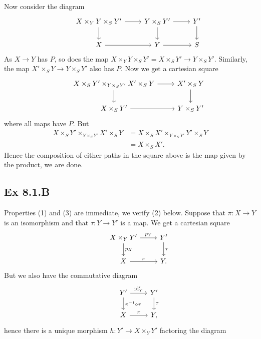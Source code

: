 \documentclass{article}
\theoremstyle{definition}
\newcommand{\id}{\text{id}}
\begin{document}
Now consider the diagram
\[
	\begin{tikzcd}
		& X \times_Y Y \times_S Y'
		\ar[r, ""]
		\ar[d, ""]
		& Y \times_S Y'
		\ar[r, ""]
		\ar[d, ""]
		& Y'
		\ar[d, ""] \\
		& X
		\ar[r, ""]
		& Y
		\ar[r, ""]
		& S
	\end{tikzcd}
\]
As $X \to Y$ has $P$, so does the map $X \times_Y Y \times_S Y' = X \times_S Y' \to Y \times_S Y'$.
Similarly, the map $X' \times_S Y \to Y \times_S Y'$ also has $P$. Now we get a cartesian square
\[
	\begin{tikzcd}
		& X \times_S Y' \times_{Y \times_S Y'} X' \times_S Y
		\ar[r, ""]
		\ar[d, ""]
		& X' \times_S Y
		\ar[d, ""] \\
		& X \times_S Y'
		\ar[r, ""]
		& Y \times_S Y'
	\end{tikzcd}
\]
where all maps have $P$. But
\begin{align*}
	X \times_S Y' \times_{Y \times_S Y'} X' \times_S Y
	 & =
	X \times_S X' \times_{Y \times_S Y'} Y' \times_S Y \\
	 & =
	X \times_S X'.
\end{align*}
Hence the composition of either paths in the square above is the map given by the
product, we are done.

\subsection*{Ex 8.1.B}

Properties (1) and (3) are immediate, we verify (2) below. Suppose that $\pi :
	X \to Y$ is an isomorphism and that $\tau : Y \to Y'$ is a map.
We get a cartesian square
\[
	\begin{tikzcd}
		& X \times_{Y} Y'
		\ar[r, "p_Y"]
		\ar[d, "p_X"]
		& Y'
		\ar[d, "\tau"] \\
		& X
		\ar[r, "\pi"]
		& Y.
	\end{tikzcd}
\]
But we also have the commutative diagram
\[
	\begin{tikzcd}
		& Y'
		\ar[r, "\id_Y'"]
		\ar[d, "\pi^{-1} \circ \tau"]
		& Y'
		\ar[d, "\tau"] \\
		& X
		\ar[r, "\pi"]
		& Y,
	\end{tikzcd}
\]
hence there is a unique morphism $h : Y' \to X \times_Y Y'$ factoring the diagram
\end{document}
